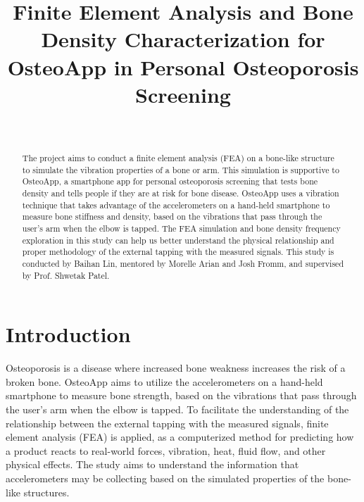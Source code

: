 \documentclass{sigchi}
\begin{document}
\title{Finite Element Analysis and Bone Density Characterization for OsteoApp in Personal Osteoporosis Screening}

\author{%
  \\
}

\maketitle

\begin{abstract}
The project aims to conduct a finite element analysis (FEA) on a bone-like structure to simulate the vibration properties of a bone or arm. This simulation is supportive to OsteoApp, a smartphone app for personal osteoporosis screening that tests bone density and tells people if they are at risk for bone disease. OsteoApp uses a vibration technique that takes advantage of the accelerometers on a hand-held smartphone to measure bone stiffness and density, based on the vibrations that pass through the user's arm when the elbow is tapped. The FEA simulation and bone density frequency exploration in this study can help us better understand the physical relationship and proper methodology of the external tapping with the measured signals. This study is conducted by Baihan Lin, mentored by Morelle Arian and Josh Fromm, and supervised by Prof. Shwetak Patel.

\end{abstract}



\section{Introduction}

Osteoporosis is a disease where increased bone weakness increases the risk of a broken bone. OsteoApp aims to utilize the accelerometers on a hand-held smartphone to measure bone strength, based on the vibrations that pass through the user's arm when the elbow is tapped. To facilitate the understanding of the relationship between the external tapping with the measured signals, finite element analysis (FEA) is applied, as a computerized method for predicting how a product reacts to real-world forces, vibration, heat, fluid flow, and other physical effects. The study aims to understand the information that accelerometers may be collecting based on the simulated properties of the bone-like structures. \\
\end{document}
